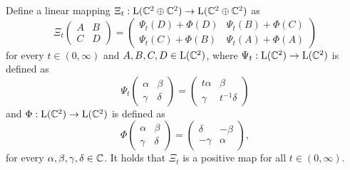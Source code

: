\begin{lemma}
  \label{lemma:3Bell}
  Define a linear mapping
  $\Xi_{t}: \mathrm{L}(\mathbb{C}^2 \oplus \mathbb{C}^2)\rightarrow
  \mathrm{L}(\mathbb{C}^2 \oplus \mathbb{C}^2)$ as
  \begin{equation}
    \Xi_t\begin{pmatrix}
    A & B\\
    C & D
    \end{pmatrix}
    = \begin{pmatrix}
      \Psi_t(D) + \Phi(D) &
      \Psi_t(B) + \Phi(C)\\[2mm]
      \Psi_t(C) + \Phi(B) &
      \Psi_t(A) + \Phi(A)
    \end{pmatrix}
  \end{equation}
  for every $t\in(0,\infty)$ and $A,B,C,D\in\mathrm{L}(\mathbb{C}^2)$, where
  $\Psi_t:\mathrm{L}(\mathbb{C}^2)\rightarrow\mathrm{L}(\mathbb{C}^2)$
  is defined as
  \begin{equation}
    \Psi_t
    \begin{pmatrix}
      \alpha & \beta \\
      \gamma & \delta
    \end{pmatrix}
    = 
    \begin{pmatrix}
      t \alpha & \beta \\
      \gamma & t^{-1} \delta
    \end{pmatrix}
  \end{equation}
  and $\Phi:\mathrm{L}(\mathbb{C}^2)\rightarrow\mathrm{L}(\mathbb{C}^2)$ is defined as
  \begin{equation}
    \Phi\begin{pmatrix}
    \alpha & \beta \\
    \gamma & \delta
    \end{pmatrix}
    = \begin{pmatrix}
      \delta & -\beta\\
      -\gamma & \alpha
    \end{pmatrix},
  \end{equation}
  for every $\alpha,\beta,\gamma,\delta\in\mathbb{C}$.
  It holds that $\Xi_t$ is a positive map for all $t\in (0,\infty)$.
\end{lemma}

